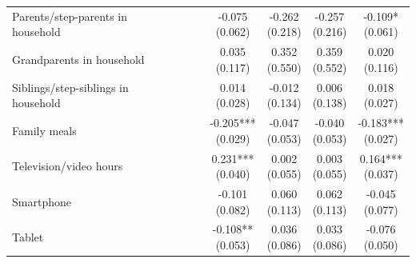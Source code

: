 \begin{table}[!htbp]
\begin{tabular}{p{}cccccc}
\\
Parents/step-parents in household &  &  & \shortstack[c]{-0.075 \\[-0.35ex] (0.062)} & \shortstack[c]{-0.262 \\[-0.35ex] (0.218)} & \shortstack[c]{-0.257 \\[-0.35ex] (0.216)} & \shortstack[c]{-0.109* \\[-0.35ex] (0.061)}
\\
Grandparents in household &  &  & \shortstack[c]{0.035 \\[-0.35ex] (0.117)} & \shortstack[c]{0.352 \\[-0.35ex] (0.550)} & \shortstack[c]{0.359 \\[-0.35ex] (0.552)} & \shortstack[c]{0.020 \\[-0.35ex] (0.116)}
\\
Siblings/step-siblings in household &  &  & \shortstack[c]{0.014 \\[-0.35ex] (0.028)} & \shortstack[c]{-0.012 \\[-0.35ex] (0.134)} & \shortstack[c]{0.006 \\[-0.35ex] (0.138)} & \shortstack[c]{0.018 \\[-0.35ex] (0.027)}
\\
Family meals &  &  & \shortstack[c]{-0.205*** \\[-0.35ex] (0.029)} & \shortstack[c]{-0.047 \\[-0.35ex] (0.053)} & \shortstack[c]{-0.040 \\[-0.35ex] (0.053)} & \shortstack[c]{-0.183*** \\[-0.35ex] (0.027)}
\\
Television/video hours &  &  & \shortstack[c]{0.231*** \\[-0.35ex] (0.040)} & \shortstack[c]{0.002 \\[-0.35ex] (0.055)} & \shortstack[c]{0.003 \\[-0.35ex] (0.055)} & \shortstack[c]{0.164*** \\[-0.35ex] (0.037)}
\\
Smartphone &  &  & \shortstack[c]{-0.101 \\[-0.35ex] (0.082)} & \shortstack[c]{0.060 \\[-0.35ex] (0.113)} & \shortstack[c]{0.062 \\[-0.35ex] (0.113)} & \shortstack[c]{-0.045 \\[-0.35ex] (0.077)}
\\
Tablet &  &  & \shortstack[c]{-0.108** \\[-0.35ex] (0.053)} & \shortstack[c]{0.036 \\[-0.35ex] (0.086)} & \shortstack[c]{0.033 \\[-0.35ex] (0.086)} & \shortstack[c]{-0.076 \\[-0.35ex] (0.050)}

\end{tabular}
\end{table}

